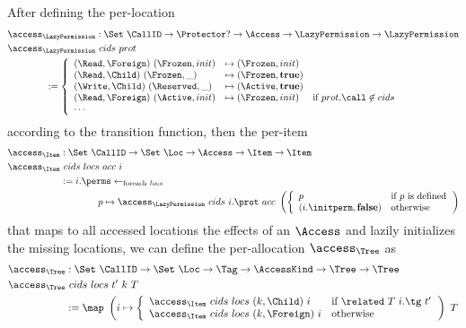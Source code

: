 \documentclass[a4paper,11pt]{article}
\theoremstyle{plain}
\theoremstyle{definition}
\theoremstyle{remark}
\begin{document}
After defining the per-location
\begin{align*}
    &\access_\LazyPermission : \Set~\CallID \to \Protector? \to \Access \to \LazyPermission \to \LazyPermission \\
    &\access_\LazyPermission ~cids~prot \\
    &\qquad\qquad:= \left\{\begin{array}{lll}
        (\Read,\Foreign)~(\Frozen, init) & \mapsto (\Frozen, init) & \\
        (\Read,\Child)~(\Frozen, \_) & \mapsto (\Frozen, \textbf{true}) & \\
        (\Write,\Child)~(\Reserved, \_) & \mapsto (\Active, \textbf{true}) & \\
        (\Read,\Foreign)~(\Active, init) & \mapsto (\Frozen, init) & \text{if \(prot.\call \not\in cids\)} \\
        \cdots & &
    \end{array}\right.
\end{align*}
according to the transition function, then the per-item
\begin{align*}
    \access_\Item& : \Set~\CallID \to \Set~\Loc \to \Access \to \Item \to \Item \\
    \access_\Item& ~cids~locs~acc~i \\
    &:= i.\perms \gets_{\text{foreach}~ locs} \\
    &\qquad\qquad p \mapsto \access_\LazyPermission~cids~i.\prot~acc~\left(\left\{\begin{array}{ll}
        p & \text{if \(p\) is defined} \\
        (i.\initperm, \textbf{false}) & \text{otherwise}
    \end{array}\right.\right)
\end{align*}
that maps to all accessed locations the effects of an \(\Access\) and lazily initializes the
missing locations, we can define the per-allocation
\(\access_\Tree\) as
\begin{align*}
    \access_\Tree& : \Set~\CallID \to \Set~\Loc \to \Tag \to \AccessKind \to \Tree \to \Tree \\
    \access_\Tree& ~cids~locs~t'~k~T \\
    & := \map~\left(i \mapsto \left\{\begin{array}{ll}
        \access_\Item~cids~locs~(k, \Child)~i & \text{if \(\related~T~i.\tg~t'\)} \\
        \access_\Item~cids~locs~(k, \Foreign)~i & \text{otherwise}
    \end{array}\right.\right)~T
\end{align*}
\end{document}
